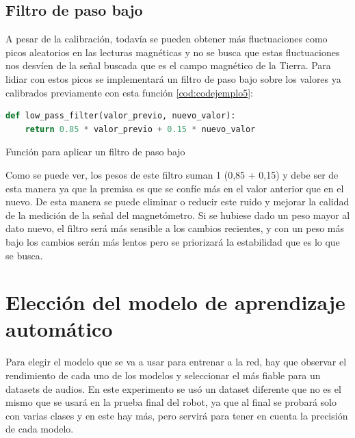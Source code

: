 \subsection{Filtro de paso bajo}
\label{subsec:filtro_paso_bajo}

A pesar de la calibración, todavía se pueden obtener más fluctuaciones como picos aleatorios en las lecturas magnéticas y no se busca que estas fluctuaciones nos desvíen de la señal buscada que es el campo magnético de la Tierra. Para lidiar con estos picos se implementará un filtro de paso bajo sobre los valores ya calibrados previamente con esta función \ref{cod:codejemplo5}:

\begin{code}[H]
\begin{lstlisting}[language=Python]
def low_pass_filter(valor_previo, nuevo_valor):
    return 0.85 * valor_previo + 0.15 * nuevo_valor
\end{lstlisting}
\caption[Función para aplicar un filtro de paso bajo]{Función para aplicar un filtro de paso bajo}
\label{cod:codejemplo5}
\end{code}


Como se puede ver, los pesos de este filtro suman 1 (0,85 + 0,15) y debe ser de esta manera ya que la premisa es que se confíe más en el valor anterior que en el nuevo. De esta manera se puede eliminar o reducir este ruido y mejorar la calidad de la medición de la señal del magnetómetro. Si se hubiese dado un peso mayor al dato nuevo, el filtro será más sensible a los cambios recientes, y con un peso más bajo los cambios serán más lentos pero se priorizará la estabilidad que es lo que se busca.

\section{Elección del modelo de aprendizaje automático}
\label{sec:eleccion_modelo}

Para elegir el modelo que se va a usar para entrenar a la red, hay que observar el rendimiento de cada uno de los modelos y seleccionar el más fiable para un datasets de audios. En este experimento se usó un dataset diferente que no es el mismo que se usará en la prueba final del robot, ya que al final se probará solo con varias clases y en este hay más, pero servirá para tener en cuenta la precisión de cada modelo. \\

